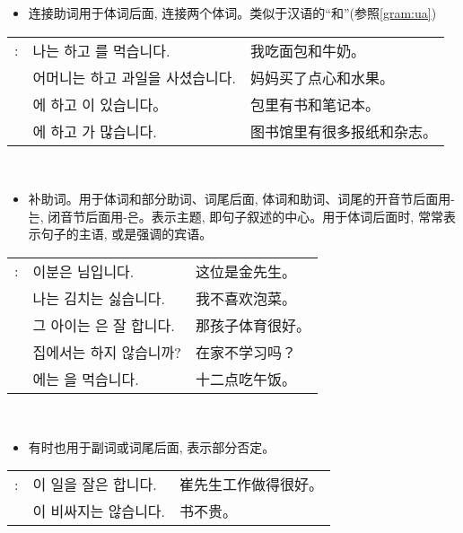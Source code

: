 \begin{grammar}
    \begin{grammarsect}[\kr -하고]
    \begin{itemize}
        \item 连接助词用于体词后面, 连接两个体词。类似于汉语的“和”(参照\ref{gram:ua})
    \end{itemize}
    \begin{tabular}{lll}
        \kr \ruby{例}{예}: &\kr 나는 \ruby{빵}{pão}하고 \ruby{牛乳}{우유}를 먹습니다.&我吃面包和牛奶。 \\
        &\kr 어머니는 \ruby{菓子}{과자}하고 과일을 사셨습니다. &妈妈买了点心和水果。\\ 
        &\kr \ruby{가방}{かばん}에 \ruby{冊}{책}하고 \ruby{空冊}{공책}이 있습니다。&包里有书和笔记本。\\
        &\kr \ruby{圖書館}{도서관}에 \ruby{新聞}{신문}하고 \ruby{雜誌}{잡지}가 많습니다.&图书馆里有很多报纸和杂志。\\
    \end{tabular}\\
    \end{grammarsect}
    \begin{grammarsect}[\kr -은 / -는]
        \begin{itemize}
            \item 补助词。用于体词和部分助词、词尾后面, 体词和助词、词尾的开音节后面用{\kr -는}, 闭音节后面用{\kr -은}。表示主题, 即句子叙述的中心。用于体词后面时, 常常表示句子的主语, 或是强调的宾语。
        \end{itemize}
        \begin{tabular}{lll}
            \kr \ruby{例}{예}: &\kr 이분은 \ruby{金}{김} \ruby{先生}{선생}님입니다.&这位是金先生。\\
            &\kr 나는 김치는 싫습니다.&我不喜欢泡菜。\\
            &\kr 그 아이는 \ruby{運動}{운동}은 잘 합니다.&那孩子体育很好。\\
            &\kr 집에서는 \ruby{工夫}{공부}하지 않습니까?&在家不学习吗？\\
            &\kr \ruby{ / 2}{열두}\ruby{時}{시}에는 \ruby{點心}{점심}을 먹습니다.&十二点吃午饭。
        \end{tabular}\\
        \begin{itemize}
            \item 有时也用于副词或词尾后面, 表示部分否定。
        \end{itemize}
        \begin{tabular}{lll}
            \kr \ruby{例}{예}: &\kr \ruby{崔}{최} \ruby{先生}{선생}이 일을 잘은 합니다.&崔先生工作做得很好。\\
            &\kr \ruby{冊}{책}이 비싸지는 않습니다.&书不贵。
        \end{tabular}\\
    \end{grammarsect}
\end{grammar}

